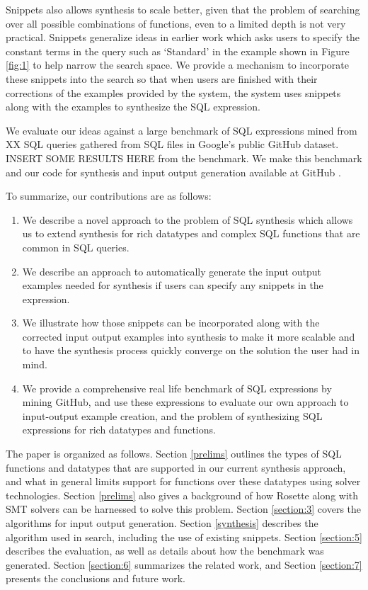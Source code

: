 Snippets also allows synthesis to scale better, given that the problem of searching over all possible combinations of functions, even to a limited depth is not very practical.  Snippets generalize ideas in earlier work \cite{BodikPLDI} which asks users to specify the constant terms in the query such as `Standard' in the example shown in Figure \ref{fig:1} to help narrow the search space.  We provide a mechanism to incorporate these snippets into the search so that when users are finished with their corrections of the examples provided by the system, the system uses snippets along with the examples to synthesize the SQL expression.

We evaluate our ideas against a large benchmark of SQL expressions mined from XX SQL queries gathered from SQL files in Google's public GitHub \cite{GitHub_repo} dataset.  INSERT SOME RESULTS HERE from the benchmark.  We make this benchmark and our code for synthesis and input output generation available at GitHub \cite{Quetzal}.

To summarize, our contributions are as follows:
\begin{enumerate}
\item We describe a novel approach to the problem of SQL synthesis which allows us to extend synthesis for rich datatypes and complex SQL functions that are common in SQL queries.
\item We describe an approach to automatically generate the input output examples needed for synthesis if users can specify any snippets in the expression.  
\item We illustrate how those snippets can be incorporated along with the corrected input output examples into synthesis to make it more scalable and to have the synthesis process quickly converge on the solution the user had in mind.
\item We provide a comprehensive real life benchmark of SQL expressions by mining GitHub, and use these expressions to evaluate our own approach to input-output example creation, and the problem of synthesizing SQL expressions for rich datatypes and functions.
\end{enumerate}

The paper is organized as follows.  Section \ref{prelims} outlines the types of SQL functions and datatypes that are supported in our current synthesis approach, and what in general limits support for functions over these datatypes using solver technologies.  Section \ref{prelims} also gives a background of how Rosette along with SMT solvers can be harnessed to solve this problem.  Section \ref{section:3} covers the algorithms for input output generation.  Section \ref{synthesis} describes the algorithm used in search, including the use of existing snippets.  Section \ref{section:5} describes the evaluation, as well as details about how the benchmark was generated.  Section \ref{section:6} summarizes the related work, and Section \ref{section:7} presents the conclusions and future work.

